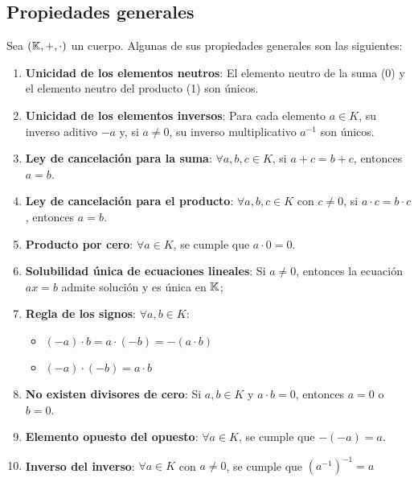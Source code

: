 	
\subsection{Propiedades generales}

Sea $(\mathbb{K}, +, \cdot)$ un cuerpo. Algunas de sus propiedades generales son las siguientes:

\begin{enumerate}
	\item \textbf{Unicidad de los elementos neutros}: El elemento neutro de la suma (0) y el elemento neutro del producto (1) son únicos.
	
	\item \textbf{Unicidad de los elementos inversos}: Para cada elemento $a \in K$, su inverso aditivo $-a$ y, si $a \neq 0$, su inverso multiplicativo $a^{-1}$ son únicos.
	
	\item \textbf{Ley de cancelación para la suma}: $\forall a, b, c \in K$, si $a + c = b + c$, entonces $a = b$.
	
	\item \textbf{Ley de cancelación para el producto}: $\forall a, b, c \in K$ con $c \neq 0$, si $a \cdot c = b \cdot c$, entonces $a = b$.
	
	\item \textbf{Producto por cero}: $ \forall a \in K$, se cumple que $a \cdot 0 = 0$.
	
	\item \textbf{Solubilidad única de ecuaciones lineales}: Si $a\ne 0$, entonces la ecuación $ax = b$ admite solución y es única en $\mathbb{K}$;
	
	\item \textbf{Regla de los signos}:
	 $\forall a, b \in K$:
	 \begin{itemize}
	 	\item $(-a) \cdot b = a \cdot (-b) = -(a \cdot b)$
	 	\item $(-a) \cdot (-b) = a \cdot b$
	 \end{itemize}
	
	\item \textbf{No existen divisores de cero}: Si $a, b \in K$ y $a \cdot b = 0$, entonces $a = 0$ o $b = 0$.
	
	\item \textbf{Elemento opuesto del opuesto}: $\forall a \in K$, se cumple que $-(-a) = a$.
	
	\item \textbf{Inverso del inverso}: $\forall a \in K$ con $a \neq 0$, se cumple que $(a^{-1})^{-1} = a$
\end{enumerate}

